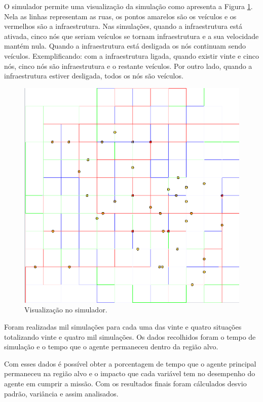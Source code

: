 O simulador permite uma visualização da simulação como apresenta a Figura \ref{fig:visulizacaoSimulador}. Nela as linhas representam as ruas, os pontos amarelos são os veículos e os vermelhos são a infraestrutura. Nas simulações, quando a infraestrutura está ativada, cinco nós que seriam veículos se tornam infraestrutura e a sua velocidade mantém nula. Quando a infraestrutura está desligada os nós continuam sendo veículos. Exemplificando: com a infraestrutura ligada, quando existir vinte e cinco nós, cinco nós são infraestrutura e o restante veículos. Por outro lado, quando a infraestrutura estiver desligada, todos os nós são veículos.

\begin{figure}[htbp]
	\centering
	\includegraphics[scale=0.4]{metodologia/figuras/simulacaoGrubix.png}
	\caption{Visualização no simulador.}
	\label{fig:visulizacaoSimulador}
\end{figure}

Foram realizadas mil simulações para cada uma das vinte e quatro situações totalizando vinte e quatro mil simulações. Os dados recolhidos foram o tempo de simulação e o tempo que o agente permaneceu dentro da região alvo.  

Com esses dados é possível obter a porcentagem de tempo que o agente principal permaneceu na região alvo e o impacto que cada variável tem no desempenho do agente em cumprir a missão. Com os resultados finais foram cálculados desvio padrão, variância e assim analisados.